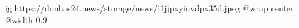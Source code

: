  
 
 
 
 

\ifcmt
  ig https://donbas24.news/storage/news/i1jjpxyiuvdpx35d.jpeg
  @wrap center
  @width 0.9
\fi
